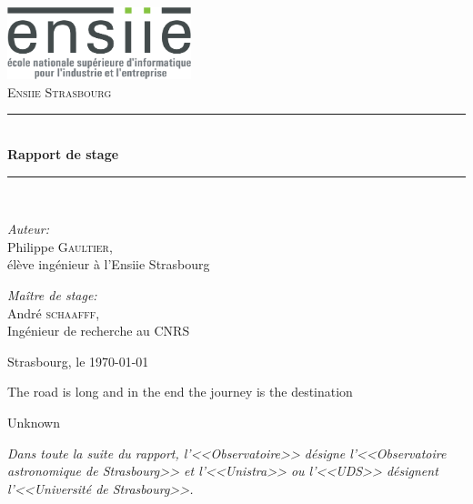 \documentclass[a4paper,french,12pt]{article}
\newcommand{\HRule}{\rule{\linewidth}{0.5mm}}
\begin{document}
\begin{titlepage}
\begin{center}

\includegraphics[width=0.4\textwidth]{./logo_ENSIIE.png}~\\[1cm]
\textsc{\huge Ensiie Strasbourg}\\[1.5cm]

\HRule \\[0.4cm]
{
	\huge \bfseries Rapport de stage
\\[0.4cm] }
\HRule \\[1.5cm]

\begin{minipage}{0.4\textwidth}
\begin{flushleft} \huge
\emph{Auteur:}\\
Philippe \textsc{Gaultier},\\[0.5cm]
\Large élève ingénieur à l'Ensiie Strasbourg
\end{flushleft}
\end{minipage}
\begin{minipage}{0.4\textwidth}
\begin{flushright} \huge
\emph{Maître de stage:} \\
André \textsc{schaafff},\\[0.5cm]
\Large Ingénieur de recherche au CNRS
\end{flushright}
\end{minipage}

\vfill

{\large Strasbourg, le \today}



\end{center}
\end{titlepage}

\newpage
{
  \centering
  {
    \vspace{3cm}
  
    \vspace{3cm}
    \epigraph{The road is long and in the end the journey is the destination}{Unknown}
  }
}
\newpage
\textit{\normalsize Dans toute la suite du rapport, l'<<Observatoire>> désigne l'<<Observatoire astronomique de Strasbourg>>
et l'<<Unistra>> ou l'<<UDS>> désignent l'<<Université de Strasbourg>>.}
\setlength{\columnseprule}{0.5pt}
\end{document}

